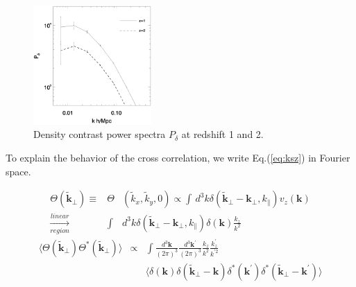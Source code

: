 \begin{figure}[tbp]
\begin{center}
\includegraphics[width=0.4\textwidth]{z1z2powerden.eps}
\end{center}
\vspace{-0.7cm}
\caption{Density contrast power spectra $P_\delta$ at redshift 1 and 2.}
\label{fig:powerden}
\end{figure}
To explain the behavior of the cross correlation, we write Eq.(\ref{eq:ksz}) in Fourier space.

\begin{eqnarray}
    \Theta(\tilde{\bm{k}}_\perp)\equiv&\Theta&(\tilde{k}_x,\tilde{k}_y,0)\propto\int\, d^3k\delta(\tilde{\bm{k}}_\perp-\bm{k_\perp},k_\parallel) v_z(\bm{k})\nonumber\\
    \xrightarrow[region]{linear}&\int& d^3k\delta(\tilde{\bm{k}}_\perp-\bm{k_\perp},k_\parallel)\delta(\bm{k})\frac{k_z}{k^2}
    \end{eqnarray}
\begin{eqnarray}
    \langle\Theta(\tilde{\bm{k}}_\perp)\Theta^{\ast}(\tilde{\bm{k}}_\perp)\rangle
    &\propto&\int \frac{d^3 \bm{k}}{(2\pi)^3}\frac{d^3 \bm{k^\prime}}{(2\pi)^3}
    \frac{k_z}{k^2}\frac{k^\prime_z}{k^{\prime2}}\\
    &&\langle \delta(\bm{k})\delta(\tilde{\bm{k}}_\perp-\bm{k})
    \delta^\ast(\bm{k^\prime})\delta^\ast(\tilde{\bm{k}}_\perp-\bm{k^\prime})\rangle
    \nonumber
\end{eqnarray}

